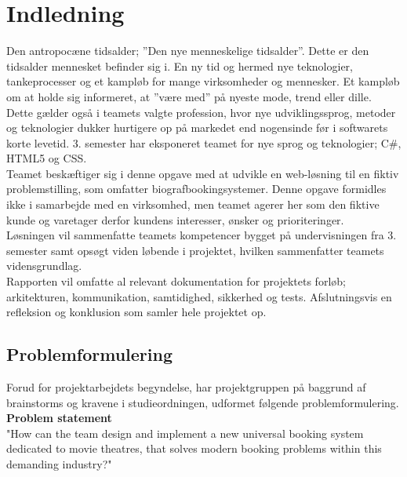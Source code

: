 \chapter{Indledning}\label{ch:indledning}
Den antropocæne tidsalder; ”Den nye menneskelige tidsalder”. Dette er den tidsalder mennesket befinder sig i.
En ny tid og hermed nye teknologier, tankeprocesser og et kampløb for mange virksomheder og mennesker. 
Et kampløb om at holde sig informeret, at ”være med” på nyeste mode, trend eller dille. \\

Dette gælder også i teamets valgte profession, hvor nye udviklingssprog, metoder og teknologier dukker 
hurtigere op på markedet end nogensinde før i softwarets korte levetid. 3. semester har eksponeret teamet for nye sprog og teknologier; 
C\#, HTML5 og CSS. \\

Teamet beskæftiger sig i denne opgave med at udvikle en web-løsning til en fiktiv problemstilling,
som omfatter biografbookingsystemer. Denne opgave formidles ikke i samarbejde med en virksomhed, 
men teamet agerer her som den fiktive kunde og varetager derfor kundens interesser, ønsker og prioriteringer. \\

Løsningen vil sammenfatte teamets kompetencer bygget på undervisningen fra 3. semester samt opsøgt viden løbende i 
projektet, hvilken sammenfatter teamets vidensgrundlag. \\

Rapporten vil omfatte al relevant dokumentation for projektets forløb; arkitekturen, 
kommunikation, samtidighed, sikkerhed og tests. Afslutningsvis en refleksion og konklusion som samler hele projektet op.

\newpage
\section{Problemformulering}\label{sec:problemformulering}
Forud for projektarbejdets begyndelse, har projektgruppen på baggrund af brainstorms og kravene i
studieordningen, udformet følgende problemformulering. \\

\textbf{Problem statement} \\
"How can the team design and implement a new universal booking system dedicated to movie theatres, 
that solves modern booking problems within this demanding industry?" \\


